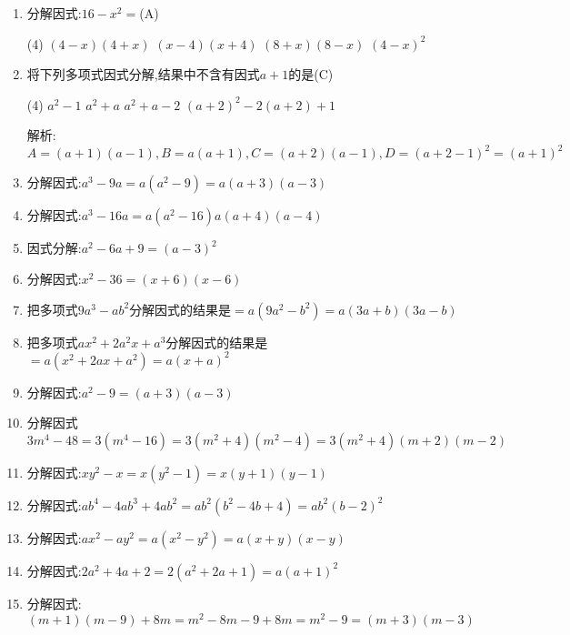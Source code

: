 \documentclass[cn,blue]{elegantbook}
\begin{document}
\begin{solution}
\begin{enumerate}
        \item 分解因式:\(16-x^2=\)(A)\\
            \begin{tasks}(4) 
                \task \((4-x)(4+x)\)
                \task \((x-4)(x+4)\)
                \task \((8+x)(8-x)\)
                \task \((4-x)^2\)
            \end{tasks}
        \item 将下列多项式因式分解,结果中不含有因式\(a+1\)的是(C)\\
            \begin{tasks}(4) 
                \task \(a^2-1\)
                \task \(a^2+a\)
                \task \(a^2+a-2\)
                \task \((a+2)^2-2(a+2)+1\)
            \end{tasks}
            解析:\(A=(a+1)(a-1), B=a(a+1), C=(a+2)(a-1), D=(a+2-1)^2=(a+1)^2\)
        \item 分解因式:\(a^3-9a=a(a^2-9)=a(a+3)(a-3)\)
        \item 分解因式:\(a^3-16a=a(a^2-16)a(a+4)(a-4)\)
        \item 因式分解:\(a^2-6a+9=(a-3)^2\)
        \item 分解因式:\(x^2-36=(x+6)(x-6)\)
        \item 把多项式\(9a^3-ab^2\)分解因式的结果是\(=a(9a^2-b^2)=a(3a+b)(3a-b)\)
        \item 把多项式\(ax^2+2a^2x+a^3\)分解因式的结果是\(=a(x^2+2ax+a^2)=a(x+a)^2\)
        \item 分解因式:\(a^2-9=(a+3)(a-3)\)
        \item 分解因式\(3m^4-48=3(m^4-16)=3(m^2+4)(m^2-4)=3(m^2+4)(m+2)(m-2)\)
        \item 分解因式:\(xy^2-x=x(y^2-1)=x(y+1)(y-1)\)
        \item 分解因式:\(ab^4-4ab^3+4ab^2=ab^2(b^2-4b+4)=ab^2(b-2)^2\)
        \item 分解因式:\(ax^2-ay^2=a(x^2-y^2)=a(x+y)(x-y)\)
        \item 分解因式:\(2a^2+4a+2=2(a^2+2a+1)=a(a+1)^2\)
        \item 分解因式:\((m+1)(m-9)+8m=m^2-8m-9+8m=m^2-9=(m+3)(m-3)\)
    \end{enumerate}
\end{solution}
\end{document}
